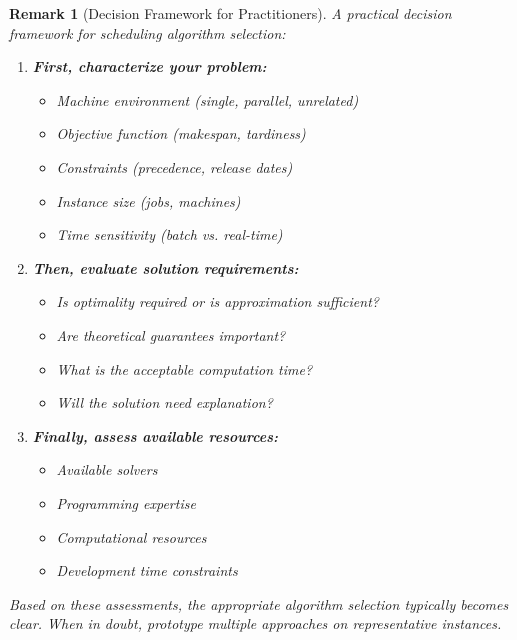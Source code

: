 \documentclass{article}
\newtheorem{remark}{Remark}
\theoremstyle{definition}
\begin{document}
\begin{remark}[Decision Framework for Practitioners]
A practical decision framework for scheduling algorithm selection:

\begin{enumerate}
    \item \textbf{First, characterize your problem:}
    \begin{itemize}
        \item Machine environment (single, parallel, unrelated)
        \item Objective function (makespan, tardiness)
        \item Constraints (precedence, release dates)
        \item Instance size (jobs, machines)
        \item Time sensitivity (batch vs. real-time)
    \end{itemize}
    
    \item \textbf{Then, evaluate solution requirements:}
    \begin{itemize}
        \item Is optimality required or is approximation sufficient?
        \item Are theoretical guarantees important?
        \item What is the acceptable computation time?
        \item Will the solution need explanation?
    \end{itemize}
    
    \item \textbf{Finally, assess available resources:}
    \begin{itemize}
        \item Available solvers
        \item Programming expertise
        \item Computational resources
        \item Development time constraints
    \end{itemize}
\end{enumerate}

Based on these assessments, the appropriate algorithm selection typically becomes clear. When in doubt, prototype multiple approaches on representative instances.
\end{remark}
\end{document}
